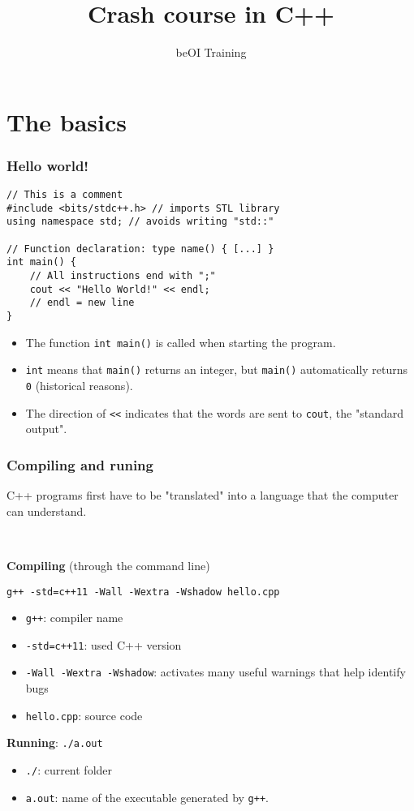 \documentclass[12pt]{beamer}
\title{Crash course in C++}
\subtitle{}
\author{beOI Training}
\institute{\texttt{[image: ../share/beoi-logo]}}
\date{}
\begin{document}
\maketitle


\section{The basics}

\begin{frame}[fragile]
\frametitle{Hello world!}
\begin{lstlisting}
// This is a comment
#include <bits/stdc++.h> // imports STL library
using namespace std; // avoids writing "std::"

// Function declaration: type name() { [...] }
int main() {
    // All instructions end with ";"
    cout << "Hello World!" << endl;
    // endl = new line
}
\end{lstlisting}
\begin{itemize}
\item The function \lstinline|int main()| is called when starting the program.
\item \lstinline|int| means that \lstinline|main()| returns an integer, but \lstinline|main()| automatically returns \lstinline|0| (historical reasons).
\item The direction of \lstinline|<<| indicates that the words are sent to \lstinline|cout|, the "standard output".
\end{itemize}
\end{frame}

\begin{frame}[fragile]
\frametitle{Compiling and runing}
C++ programs first have to be "translated" into a language that the computer can understand.

~

\textbf{Compiling} (through the command line)
\begin{lstlisting}
g++ -std=c++11 -Wall -Wextra -Wshadow hello.cpp
\end{lstlisting}
\begin{itemize}
\item \lstinline|g++|: compiler name
\item \lstinline|-std=c++11|: used C++ version
\item \lstinline|-Wall -Wextra -Wshadow|: activates many useful warnings that help identify bugs
\item \lstinline|hello.cpp|: source code
\end{itemize}

\textbf{Running}: \lstinline|./a.out|
\begin{itemize}
\item \lstinline|./|: current folder
\item \lstinline|a.out|: name of the executable generated by \lstinline|g++|.
\end{itemize}
\end{frame}
\end{document}
